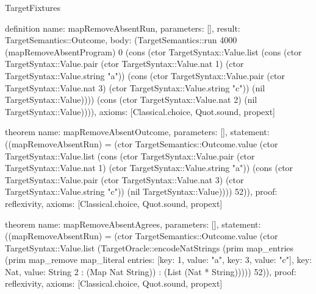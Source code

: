 \begin{lexlean}{TargetFixtures}
\begin{semanticmodule}
definition{
  name: mapRemoveAbsentRun,
  parameters: [],
  result: TargetSemantics::Outcome,
  body: (TargetSemantics::run 4000 (mapRemoveAbsentProgram) 0 (cons (ctor TargetSyntax::Value.list (cons (ctor TargetSyntax::Value.pair (ctor TargetSyntax::Value.nat 1) (ctor TargetSyntax::Value.string "a")) (cons (ctor TargetSyntax::Value.pair (ctor TargetSyntax::Value.nat 3) (ctor TargetSyntax::Value.string "c")) (nil TargetSyntax::Value)))) (cons (ctor TargetSyntax::Value.nat 2) (nil TargetSyntax::Value)))),
  axioms: [Classical.choice, Quot.sound, propext]
}

theorem{
  name: mapRemoveAbsentOutcome,
  parameters: [],
  statement: ((mapRemoveAbsentRun) = (ctor TargetSemantics::Outcome.value (ctor TargetSyntax::Value.list (cons (ctor TargetSyntax::Value.pair (ctor TargetSyntax::Value.nat 1) (ctor TargetSyntax::Value.string "a")) (cons (ctor TargetSyntax::Value.pair (ctor TargetSyntax::Value.nat 3) (ctor TargetSyntax::Value.string "c")) (nil TargetSyntax::Value)))) 52)),
  proof: reflexivity{},
  axioms: [Classical.choice, Quot.sound, propext]
}

theorem{
  name: mapRemoveAbsentAgrees,
  parameters: [],
  statement: ((mapRemoveAbsentRun) = (ctor TargetSemantics::Outcome.value (ctor TargetSyntax::Value.list (TargetOracle::encodeNatStrings (prim map_entries (prim map_remove map_literal{
    entries: [{key: 1, value: "a"}, {key: 3, value: "c"}],
    key: Nat,
    value: String
  } 2 : (Map Nat String)) : (List (Nat * String))))) 52)),
  proof: reflexivity{},
  axioms: [Classical.choice, Quot.sound, propext]
}


\end{semanticmodule}
\end{lexlean}
